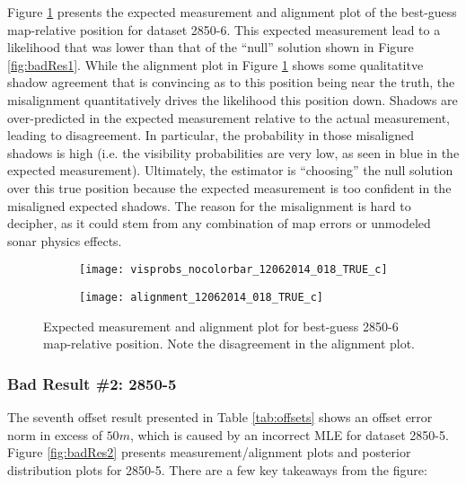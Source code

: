 Figure \ref{fig:badExp1} presents the expected measurement and alignment plot of the best-guess map-relative position for dataset 2850-6.  
This expected measurement lead to a likelihood that was lower than that of the ``null'' solution shown in Figure \ref{fig:badRes1}.
While the alignment plot in Figure \ref{fig:badExp1} shows some qualitatitve shadow agreement that is convincing as to this position being near the truth, the misalignment quantitatively drives the likelihood this position down.
Shadows are over-predicted in the expected measurement relative to the actual measurement, leading to disagreement.
In particular, the probability in those misaligned shadows is high (i.e. the visibility probabilities are very low, as seen in blue in the expected measurement).
Ultimately, the estimator is ``choosing'' the null solution over this true position because the expected measurement is too confident in the misaligned expected shadows.
The reason for the misalignment is hard to decipher, as it could stem from any combination of map errors or unmodeled sonar physics effects.

\begin{figure} [h!]
	\centering
	\begin{subfigure}[b]{0.48\textwidth}
                \texttt{[image: visprobs\_nocolorbar\_12062014\_018\_TRUE\_c]}
                \caption{}
	\end{subfigure}
  	\centering
	\begin{subfigure}[b]{0.48\textwidth}
                \texttt{[image: alignment\_12062014\_018\_TRUE\_c]}
		\caption{}
  	\end{subfigure}

	\caption{Expected measurement and alignment plot for best-guess 2850-6 map-relative position.  Note the disagreement in the alignment plot.}
	\label{fig:badExp1}
\end{figure}

\subsubsection{Bad Result \#2: 2850-5}
\label{rov.Truth.Bad2}

The seventh offset result presented in Table \ref{tab:offsets} shows an offset error norm in excess of $50m$, which is caused by an incorrect MLE for dataset 2850-5.
Figure \ref{fig:badRes2} presents measurement/alignment plots and posterior distribution plots for 2850-5.
There are a few key takeaways from the figure:

